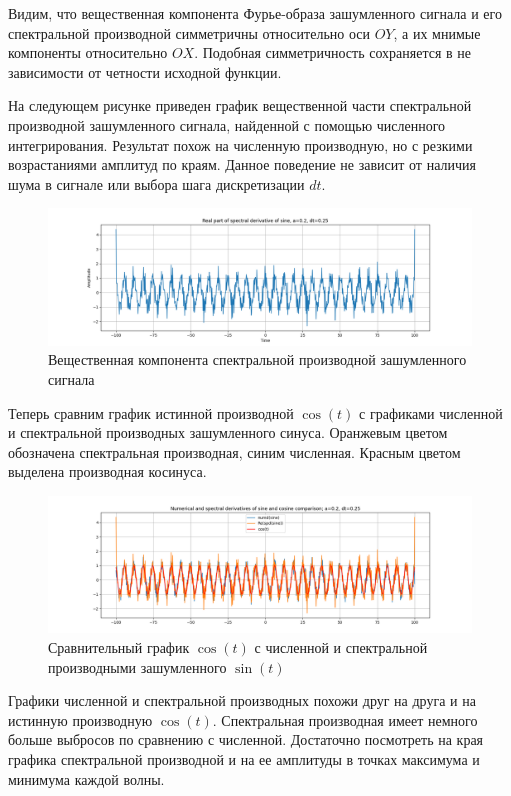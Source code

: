 \documentclass[a4paper, 12pt]{article}
\begin{document}
    Видим, что вещественная компонента Фурье-образа зашумленного сигнала и его спектральной производной симметричны относительно оси
    $OY$, а их мнимые компоненты относительно $OX$. Подобная симметричность сохраняется в не зависимости от четности исходной функции.


    На следующем рисунке приведен график вещественной части спектральной производной зашумленного сигнала, найденной с помощью численного интегрирования.
    Результат похож на численную производную, но с резкими возрастаниями амплитуд по краям. Данное поведение не зависит от наличия шума в сигнале или
    выбора шага дискретизации $dt$.
    \begin{figure}[H]
        \centering
        \includegraphics[scale=0.4]{1_re_specdiff_sine.png}
        \captionsetup{skip=0pt}
        \caption{Вещественная компонента спектральной производной зашумленного сигнала}
        \label{fig:1respds}
    \end{figure}

    
    Теперь сравним график истинной производной $\cos{(t)}$ с графиками численной и спектральной производных зашумленного синуса.
    Оранжевым цветом обозначена спектральная производная, синим численная. Красным цветом выделена производная косинуса.
    \begin{figure}[H]
        \centering
        \includegraphics[scale=0.4]{1_css_comp.png}
        \captionsetup{skip=0pt}
        \caption{Сравнительный график $\cos{(t)}$ с численной и спектральной производными зашумленного $\sin{(t)}$}
        \label{fig:css_comp}
    \end{figure}


    Графики численной и спектральной производных похожи друг на друга и на истинную производную $\cos{(t)}$.
    Спектральная производная имеет немного больше выбросов по сравнению с численной. Достаточно посмотреть
    на края графика спектральной производной и на ее амплитуды в точках максимума и минимума каждой волны.
\end{document}
